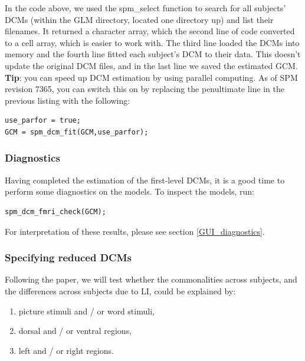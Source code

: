 \documentclass{article}
\begin{document}
In the code above, we used the spm\_select function to search for all subjects' DCMs (within the GLM directory, located one directory up) and list their filenames. It returned a character array, which the second line of code converted to a cell array, which is easier to work with. The third line loaded the DCMs into memory and the fourth line fitted each subject's DCM to their data. This doesn't update the original DCM files, and in the last line we saved the estimated GCM. \\

\textbf{Tip}: you can speed up DCM estimation by using parallel computing. As of SPM revision 7365, you can switch this on by replacing the penultimate line in the previous listing with the following:

\begin{lstlisting}[style=Matlab-editor, caption=Enabling parallel DCM estimation]
use_parfor = true;
GCM = spm_dcm_fit(GCM,use_parfor);

\end{lstlisting}

\subsubsection{Diagnostics}
Having completed the estimation of the first-level DCMs, it is a good time to perform some diagnostics on the models. To inspect the models, run:

\begin{lstlisting}[style=Matlab-editor, caption=DCM for fMRI diagnostics]
spm_dcm_fmri_check(GCM);
\end{lstlisting}

For interpretation of these results, please see section \ref{GUI_diagnostics}.

\subsubsection{Specifying reduced DCMs}
Following the paper, we will test whether the commonalities across subjects, and the differences across subjects due to LI, could be explained by:

\begin{enumerate}
    \item picture stimuli and / or word stimuli,
    \item dorsal and / or ventral regions,
    \item left and / or right regions.
\end{enumerate}
\end{document}
